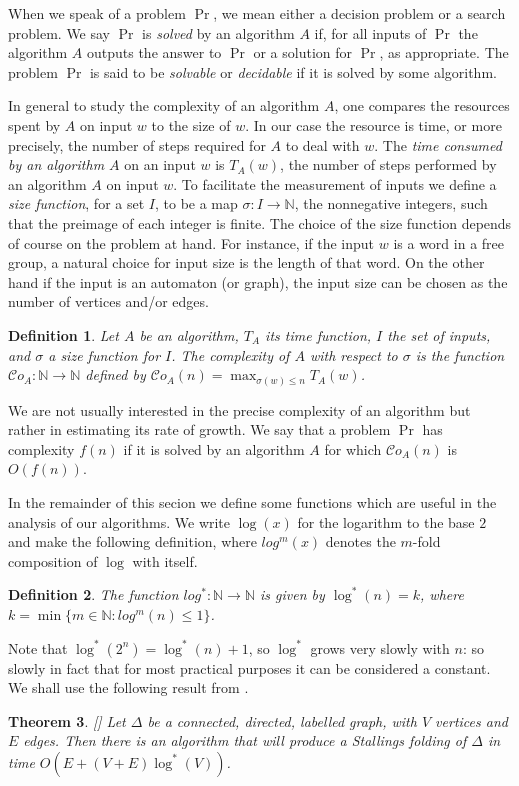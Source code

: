\documentclass[a4paper,12pt]{article}
\newcommand{\D}{\Delta }
\newtheorem{theorem}{Theorem}[section]
\newtheorem{definition}[theorem]{Definition}
\numberwithin{equation}{section}
\numberwithin{figure}{section}
\newcommand{\NN}{\ensuremath{\mathbb{N}}}
\newcommand{\cC}{\mathcal{C}}
\newcommand{\maps}{\rightarrow}
\begin{document}
When we speak of a problem $\Pr$, we mean either a decision problem
or a search problem.
 We say $\Pr$ is \emph{solved} by an algorithm $A$ if, for all inputs of $\Pr$ the
algorithm $A$ outputs the answer to $\Pr$ or a solution for $\Pr$,
as appropriate.
The problem $\Pr$ is said to be \emph{solvable} or \emph{decidable} if it is
solved by some algorithm.

 In general to study the complexity of an algorithm $A$,
one compares the resources spent by $A$ on input $w$ to the size of
$w$.
In our case the resource is time, or more precisely, the number
of steps required for $A$ to deal with $w$.
The \emph{time consumed by an algorithm $A$} on an input $w$ is
$T_{A}(w)$, the number of steps performed by an algorithm $A$ on
 input $w$. To facilitate the measurement of inputs we define a
 \emph{size function}, for a set $I$, to be a map $\sigma:I\to \mathbb N$, the
nonnegative integers, such that the preimage of each integer is
finite.
The choice of the size function depends of course on the problem at hand.
For instance, if the input $w$ is a word in a free group, a natural
choice for input size is the length of that word.
On the other hand  if the input is
an automaton (or graph), the input size can be chosen as the number of vertices and/or edges.
\begin{definition}
Let $A$ be an algorithm, $T_{A}$ its time function, $I$ the set of
inputs, and $\sigma$ a size function for $I$. The \emph{ complexity of $A$} with respect to $\sigma$ is the function
$\cC o_{A}:\NN \to \NN$ defined by $\cC o_{A}(n)=\max_{\sigma(w)\le n}
T_{A}(w)$.
\end{definition}

We are not usually interested in the precise complexity of an algorithm
but rather in estimating its rate of growth. We say that a problem
$\Pr$ has  complexity $f(n)$ if it is solved by an
algorithm $A$ for which $\cC o_{A}(n)$ is $O(f(n))$.

In the remainder of this secion we define some functions which are useful
in the analysis of our algorithms. We write $\log(x)$ for the logarithm to the base $2$ and make the
following definition, where $log^m(x)$ denotes the $m$-fold composition
of $\log$ with itself.
\begin{definition}\label{def:log}
The function $log^*:\NN\maps \NN$ is given by $\log^*(n)=k$, where
$k=\min\{m\in \NN: log^m(n)\le 1\}$.
\end{definition}
Note that $\log^*(2^n)=\log^*(n)+1$, so $\log^*$ grows very slowly with $n$:
so slowly in fact that for most practical purposes it can be
considered a constant.
We shall use the following result from \cite{touikan06}.
\begin{theorem}\label{th:toui}[{\cite[Theorem 1.6]{touikan06}}]%
Let $\D$ be a connected, directed, labelled graph, with $V$ vertices and
$E$ edges. Then there is an algorithm that will produce a Stallings folding of
$\D$ in time $O(E+(V+E)\log^*(V))$.
\end{theorem}
\end{document}
